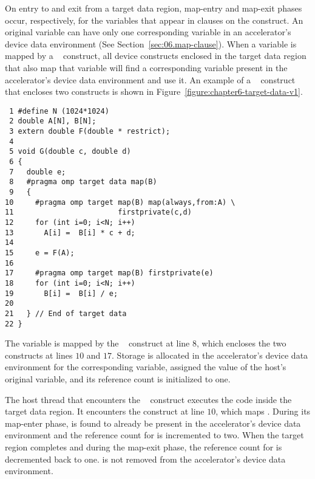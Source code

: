 On entry to and exit from a target data region, map-entry and map-exit phases
occur, respectively, for the variables that appear in  clauses on the
construct.  An original variable can have only one corresponding variable in an
accelerator's device data environment (See Section~\ref{sec:06.map-clause}).
When a variable is mapped by a ~ construct, all device
constructs enclosed in the target data region that also map that variable will
find a corresponding variable present in the accelerator's device data
environment and use it. An example of a ~ construct
that encloses two  constructs is shown in
Figure~\ref{figure:chapter6-target-data-v1}.

\begin{figure*}[!tbhp]
\begin{verbatim}
 1 #define N (1024*1024)
 2 double A[N], B[N];
 3 extern double F(double * restrict);
 4 
 5 void G(double c, double d)
 6 {
 7   double e;
 8   #pragma omp target data map(B)
 9   {
10     #pragma omp target map(B) map(always,from:A) \
11                        firstprivate(c,d)
12     for (int i=0; i<N; i++)
13       A[i] =  B[i] * c + d;
14 
15     e = F(A);
16 
17     #pragma omp target map(B) firstprivate(e)
18     for (int i=0; i<N; i++)
19       B[i] =  B[i] / e;
20 
21   } // End of target data
22 }
\end{verbatim}
\caption{ \textbf {Example of a target data construct} -- \small
          The array variable \texttt{B} is mapped once to an accelerator
          across two target regions.
         }
\label{figure:chapter6-target-data-v1}
\end{figure*}

The variable  is mapped by the ~ construct at line
$8$, which encloses the two \code{target} constructs at lines $10$
and $17$.  Storage is allocated in the accelerator's device data environment
for the corresponding  variable, assigned the value of the host's
original \code{B} variable, and its reference count is initialized to one.

The host thread that encounters the ~ construct
executes the code inside the target data region.  It encounters the 
construct at line $10$, which maps .  During its map-enter phase,  is found
to already be present in the accelerator's device data environment and the
reference count for  is incremented to two.  When the target region completes
and during the map-exit phase, the reference count for  is decremented back
to one.  \code{B} is not removed from the accelerator's device data environment.

